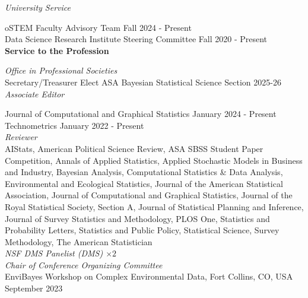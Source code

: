 \documentclass[margin,line]{res}
\begin{document}
\begin{resume}
\vspace{-.3cm}
{\em University Service}

\vspace{-.3cm}
oSTEM Faculty Advisory Team \hfill {Fall 2024 - Present} \\ 
Data Science Research Institute Steering Committee \hfill {Fall 2020 - Present} \\


{\bf Service to the Profession}

\vspace{-.3cm}
{\em Office in Professional Societies} \\
Secretary/Treasurer Elect ASA Bayesian Statistical Science Section \hfill {2025-26} \\

\vspace{-.3cm}
{\em Associate Editor}

\vspace{-.3cm}
Journal of Computational and Graphical Statistics \hfill {January 2024 - Present} \\
Technometrics \hfill {January 2022 - Present} \\

{\em Reviewer} \\
AIStats, American Political Science Review, ASA SBSS Student Paper Competition, Annals of Applied Statistics, Applied Stochastic Models in Business and Industry, Bayesian Analysis, Computational Statistics \& Data Analysis, Environmental and Ecological Statistics, Journal of the American Statistical Association, Journal of Computational and Graphical Statistics, Journal of the Royal Statistical Society, Section A, Journal of Statistical Planning and Inference, Journal of Survey Statistics and Methodology, PLOS One, Statistics and Probability Letters, Statistics and Public Policy, Statistical Science, Survey Methodology, The American Statistician \\

\vspace{-.3cm}
{\em NSF DMS Panelist (DMS) $\times 2$} \\

\vspace{-.3cm}
{\em Chair of Conference Organizing Committee} \\
EnviBayes Workshop on Complex Environmental Data, Fort Collins, CO, USA \hfill {September 2023} \\


\end{resume}
\end{document}
